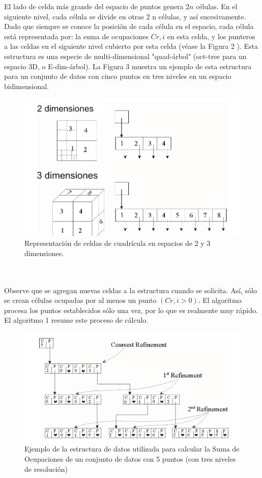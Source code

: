 El lado de celda más grande del espacio de puntos genera $2 n$ células. En el siguiente nivel, cada célula se divide en otras 2 n células, y así sucesivamente. Dado que siempre se conoce la posición de cada célula en el espacio, cada célula está representada por: la suma de ocupaciones $C r, i$ en esta celda, y los punteros a las celdas en el siguiente nivel cubierto por esta celda (véase la Figura 2 ). Esta estructura es una especie de multi-dimensional "quad-árbol" (oct-tree para un espacio 3D, o E-dim-árbol). La Figura 3 muestra un ejemplo de esta estructura para un conjunto de datos con cinco puntos en tres niveles en un espacio bidimensional.\\


\begin{figure}[h]
\centering
\includegraphics[scale=1.0]{chapter4/ima5.png}
\caption{ Representación de celdas de cuadrícula en espacios de 2 y 3 dimensiones. }
\label{fig:ima5}
\end{figure}
\\\\

Observe que se agregan nuevas celdas a la estructura cuando se solicita. Así, sólo se crean células ocupadas por al menos un punto $(C r, i> 0)$. El algoritmo procesa los puntos establecidos sólo una vez, por lo que es realmente muy rápido. El algoritmo 1 resume este proceso de cálculo.\\


\begin{figure}[h]
\centering
\includegraphics[scale=1.2]{chapter4/ima6.png}
\caption{Ejemplo de la estructura de datos utilizada para calcular la Suma de Ocupaciones de un conjunto de datos con 5 puntos (con tres niveles de resolución) }
\label{fig:ima6}
\end{figure}
 


